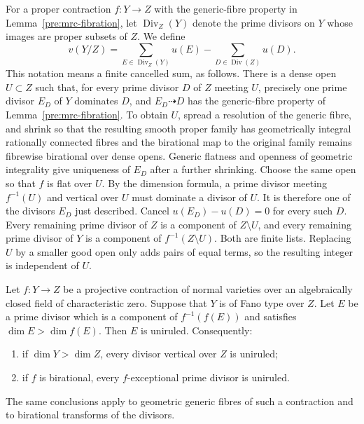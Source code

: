 For a proper contraction $f:Y\to Z$ with the generic-fibre property in
Lemma~\ref{pre:mrc-fibration}, let $\operatorname{Div}_{Z}(Y)$ denote the
prime divisors on $Y$ whose images are proper subsets of $Z$.
We define
\begin{equation}
\label{sl:v-definition}
 v(Y/Z)=
 \sum_{E\in\operatorname{Div}_{Z}(Y)}u(E)
 -\sum_{D\in\operatorname{Div}(Z)}u(D).
\end{equation}
This notation means a finite cancelled sum, as follows.  There is a
dense open $U\subset Z$ such that, for every prime divisor $D$ of $Z$
meeting $U$, precisely one prime divisor $E_D$ of $Y$ dominates $D$,
and $E_D\dashrightarrow D$ has the generic-fibre property of
Lemma~\ref{pre:mrc-fibration}.  To obtain $U$, spread a resolution of the
generic fibre, and shrink so that the resulting smooth proper family
has geometrically integral rationally connected fibres and the
birational map to the original family remains fibrewise birational
over dense opens.  Generic flatness and openness of geometric
integrality give uniqueness of $E_D$ after a further shrinking.
Choose the same open so that $f$ is flat over $U$.  By the dimension
formula, a prime divisor meeting $f^{-1}(U)$ and vertical over $U$
must dominate a divisor of $U$.  It is therefore one of the divisors
$E_D$ just described.
Cancel $u(E_D)-u(D)=0$ for every such $D$.
Every remaining prime divisor of $Z$ is a component of $Z\setminus U$,
and every remaining prime divisor of $Y$ is a component of
$f^{-1}(Z\setminus U)$.  Both are finite lists.  Replacing $U$ by a
smaller good open only adds pairs of equal terms, so the resulting
integer is independent of $U$.

\begin{lemma}
\label{sl:uniruled-vertical}
Let $f:Y\to Z$ be a projective contraction of normal varieties over an
algebraically closed field of characteristic zero.  Suppose that $Y$
is of Fano type over $Z$.  Let $E$ be a prime divisor which is a
component of $f^{-1}(f(E))$ and satisfies
$\dim E>\dim f(E)$.  Then $E$ is uniruled.
Consequently:
\begin{enumerate}[label=(\roman*)]
\item if $\dim Y>\dim Z$, every divisor vertical over $Z$ is uniruled;
\item if $f$ is birational, every $f$-exceptional prime divisor is
uniruled.
\end{enumerate}
The same conclusions apply to geometric generic fibres of such a
contraction and to birational transforms of the divisors.
\end{lemma}


